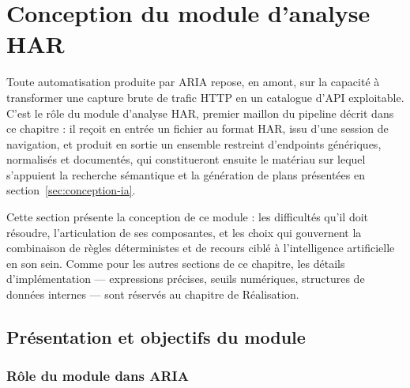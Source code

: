 %

\section{Conception du module d'analyse HAR}
\label{sec:conception-har}

Toute automatisation produite par ARIA repose, en amont, sur la capacité à transformer une capture brute de trafic HTTP en un catalogue d'API exploitable. C'est le rôle du module d'analyse HAR, premier maillon du pipeline décrit dans ce chapitre : il reçoit en entrée un fichier au format HAR, issu d'une session de navigation, et produit en sortie un ensemble restreint d'endpoints génériques, normalisés et documentés, qui constitueront ensuite le matériau sur lequel s'appuient la recherche sémantique et la génération de plans présentées en section~\ref{sec:conception-ia}.

Cette section présente la conception de ce module : les difficultés qu'il doit résoudre, l'articulation de ses composantes, et les choix qui gouvernent la combinaison de règles déterministes et de recours ciblé à l'intelligence artificielle en son sein. Comme pour les autres sections de ce chapitre, les détails d'implémentation — expressions précises, seuils numériques, structures de données internes — sont réservés au chapitre de Réalisation.

\subsection{Présentation et objectifs du module}

\subsubsection{Rôle du module dans ARIA}

